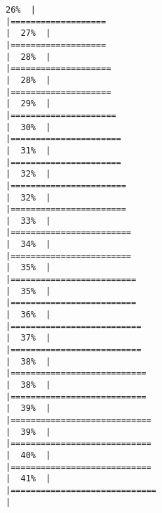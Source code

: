 \documentclass[
]{book}
\begin{document}
\begin{verbatim}
26%  |                                                                              |===================                                                   |  27%  |                                                                              |===================                                                   |  28%  |                                                                              |====================                                                  |  28%  |                                                                              |====================                                                  |  29%  |                                                                              |=====================                                                 |  30%  |                                                                              |======================                                                |  31%  |                                                                              |======================                                                |  32%  |                                                                              |=======================                                               |  32%  |                                                                              |=======================                                               |  33%  |                                                                              |========================                                              |  34%  |                                                                              |========================                                              |  35%  |                                                                              |=========================                                             |  35%  |                                                                              |=========================                                             |  36%  |                                                                              |==========================                                            |  37%  |                                                                              |==========================                                            |  38%  |                                                                              |===========================                                           |  38%  |                                                                              |===========================                                           |  39%  |                                                                              |============================                                          |  39%  |                                                                              |============================                                          |  40%  |                                                                              |============================                                          |  41%  |                                                                              |=============================                                         |  
\end{verbatim}
\end{document}
